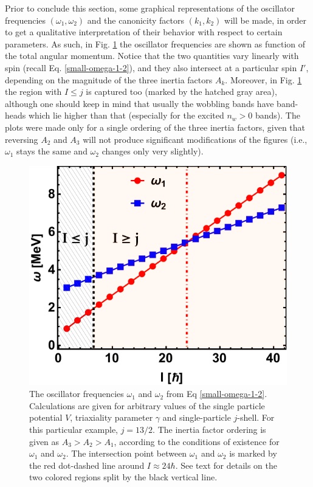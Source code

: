 Prior to conclude this section, some graphical representations of the oscillator frequencies $(\omega_1,\omega_2)$ and the canonicity factors $(k_1,k_2)$ will be made, in order to get a qualitative interpretation of their behavior with respect to certain parameters. As such, in Fig. \ref{fig-omega1-omega2} the oscillator frequencies are shown as function of the total angular momentum. Notice that the two quantities vary linearly with spin (recall Eq. \ref{small-omega-1-2}), and they also intersect at a particular spin $I'$, depending on the magnitude of the three inertia factors $A_k$. Moreover, in Fig. \ref{fig-omega1-omega2} the region with $I\leq j$ is captured too (marked by the hatched gray area), although one should keep in mind that usually the wobbling bands have band-heads which lie higher than that (especially for the excited $n_w>0$ bands). The plots were made only for a single ordering of the three inertia factors, given that reversing $A_2$ and $A_3$ will not produce significant modifications of the figures (i.e., $\omega_1$ stays the same and $\omega_2$ changes only very slightly).
\begin{figure}
    \centering
    \includegraphics[scale=0.8]{Chapters/Figures/omega-1-2-frequencies-1.pdf}
    \caption{The oscillator frequencies $\omega_1$ and $\omega_2$ from Eq \ref{small-omega-1-2}. Calculations are given for arbitrary values of the single particle potential $V$, triaxiality parameter $\gamma$ and single-particle $j$-shell. For this particular example, $j=13/2$. The inertia factor ordering is given as $A_3>A_2>A_1$, according to the conditions of existence for $\omega_1$ and $\omega_2$. The intersection point between $\omega_1$ and $\omega_2$ is marked by the red dot-dashed line around $I\approx 24\hbar$. See text for details on the two colored regions split by the black vertical line.}
    \label{fig-omega1-omega2}
\end{figure}

